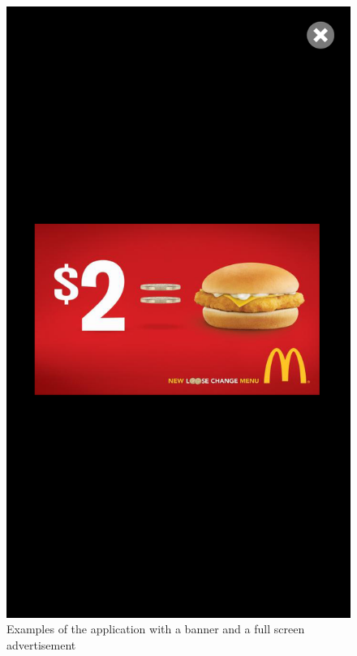\begin{figure}
\begin{center}
\includegraphics[scale=0.25]{Images/classicalad_fullscreen.png}
\caption{Examples of the application with a banner and a full screen advertisement}
\label{fig:ads1}
\end{center}
\end{figure}

